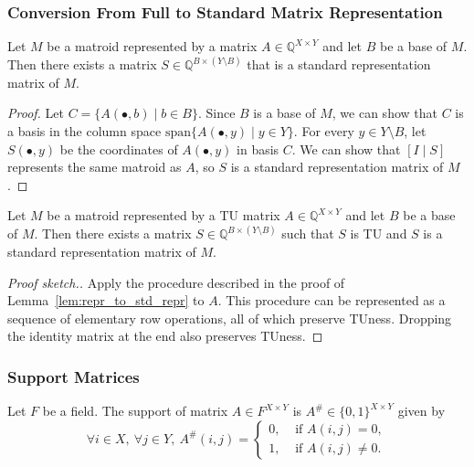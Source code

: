 
\subsubsection{Conversion From Full to Standard Matrix Representation}


\begin{lemma}\label{lem:repr_to_std_repr}
    Let $M$ be a matroid represented by a matrix $A \in \mathbb{Q}^{X \times Y}$ and let $B$ be a base of $M$. Then there exists a matrix $S \in \mathbb{Q}^{B \times (Y \setminus B)}$ that is a standard representation matrix of $M$.
\end{lemma}

\begin{proof}
    Let $C = \{A (\bullet, b) \mid b \in B\}$. Since $B$ is a base of $M$, we can show that $C$ is a basis in the column space $\mathrm{span} \{A (\bullet, y) \mid y \in Y\}$. For every $y \in Y \setminus B$, let $S (\bullet, y)$ be the coordinates of $A (\bullet, y)$ in basis $C$. We can show that $[I \mid S]$ represents the same matroid as $A$, so $S$ is a standard representation matrix of $M$.
\end{proof}

\begin{lemma}\label{lem:TU_repr_to_TU_std_repr}
    Let $M$ be a matroid represented by a TU matrix $A \in \mathbb{Q}^{X \times Y}$ and let $B$ be a base of $M$. Then there exists a matrix $S \in \mathbb{Q}^{B \times (Y \setminus B)}$ such that $S$ is TU and $S$ is a standard representation matrix of $M$.
\end{lemma}

\begin{proof}[Proof sketch.]
    Apply the procedure described in the proof of Lemma~\ref{lem:repr_to_std_repr} to $A$. This procedure can be represented as a sequence of elementary row operations, all of which preserve TUness. Dropping the identity matrix at the end also preserves TUness.
\end{proof}

\subsubsection{Support Matrices}

\begin{definition}\label{def:support_matrix}
    Let $F$ be a field. The support of matrix $A \in F^{X \times Y}$ is $A^{\#} \in \{0, 1\}^{X \times Y}$ given by
    \[
        \forall i \in X, \ \forall j \in Y, \ A^{\#} (i, j) = \begin{cases}
            0, & \text{ if } A (i, j) = 0, \\
            1, & \text{ if } A (i, j) \neq 0.
        \end{cases}
    \]
\end{definition}


